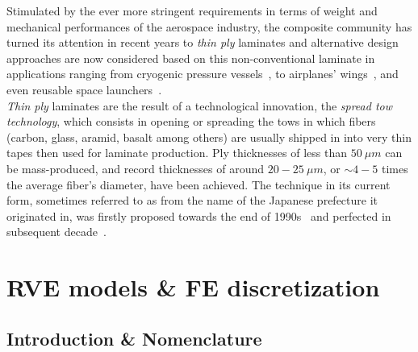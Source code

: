 \documentclass[review]{elsarticle}
\begin{document}
Stimulated by the ever more stringent requirements in terms of weight and mechanical performances of the aerospace industry, the composite community has turned its attention in recent years to \emph{thin ply} laminates and alternative design approaches are now considered based on this non-conventional laminate in applications ranging from cryogenic pressure vessels~\cite{McCarville2018}, to airplanes' wings~\cite{Kim2017}, and even reusable space launchers~\cite{Kopp2017}.\\
\emph{Thin ply} laminates are the result of a technological innovation, the \emph{spread tow technology}, which consists in opening or spreading the tows in which fibers (carbon, glass, aramid, basalt among others) are usually shipped in into very thin tapes then used for laminate production. Ply thicknesses of less than $50\ \mu m$ can be mass-produced, and record thicknesses of around $20-25\ \mu m$, or $\sim 4-5$ times the average fiber's diameter, have been achieved. The technique in its current form, sometimes referred to as  from the name of the Japanese prefecture it originated in, was firstly proposed towards the end of 1990s~\cite{Kawabe1997} and perfected in subsequent decade~\cite{Kawabe2008,Kawabe2008en}.\\



\section{RVE models \& FE discretization}

\subsection{Introduction \& Nomenclature}\label{subsec:names}
\end{document}
